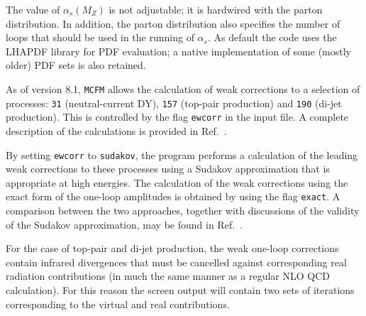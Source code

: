 

\label{subsec:pdfsets}
The value of $\alpha_s(M_Z)$ is not adjustable; it is hardwired with the
parton distribution. In addition, the parton distribution also specifies
the number of loops that should be used in the running of $\alpha_s$.
As default the code uses the LHAPDF library for PDF evaluation; a native
implementation of some (mostly older) PDF sets is also retained.

\label{subsec:EW}

As of version 8.1, {\tt MCFM} allows the calculation of weak corrections to a
selection of processes: {\tt 31} (neutral-current DY),
{\tt 157} (top-pair production) and {\tt 190} (di-jet production).
This is controlled by the flag {\tt ewcorr} in the input file.  A complete description
of the calculations is provided in Ref.~\cite{Campbell:2016dks}.

By setting {\tt ewcorr} to {\tt sudakov}, the program performs a calculation of
the leading weak corrections to these processes using a Sudakov approximation that
is appropriate at high energies.   The calculation of the weak corrections using the
exact form of the one-loop amplitudes is obtained by using the flag {\tt exact}.
A comparison between the two approaches, together with discussions of the validity of
the Sudakov approximation, may be found in Ref.~\cite{Campbell:2016dks}.

For the case of top-pair and di-jet production, the weak one-loop corrections contain
infrared divergences that must be cancelled against corresponding real radiation
contributions (in much the same manner as a regular NLO QCD calculation).  For this
reason the screen output will contain two sets of iterations corresponding to the
virtual and real contributions.

